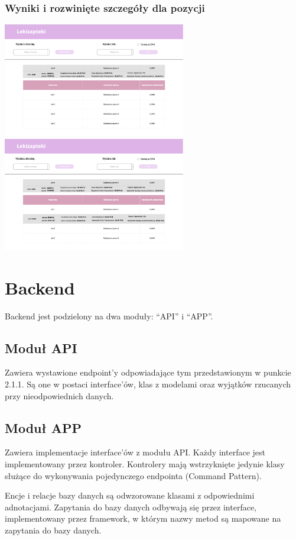 \documentclass{article}
\begin{document}
      \subsubsection{Wyniki i rozwinięte szczegóły dla pozycji}
      \includegraphics[width=8cm]{images/lekizapteki-leki-identyczne}
      \includegraphics[width=8cm]{images/lekizapteki-leki-identyczne-rozwiniete}

  \section{Backend}
  Backend jest podzielony na dwa moduły: ``API'' i ``APP''.

    \subsection{Moduł API}
    Zawiera wystawione endpoint'y odpowiadające tym przedstawionym w punkcie 2.1.1.
    Są one w postaci interface'ów, klas z modelami oraz wyjątków rzucanych przy nieodpowiednich danych.

    \subsection{Moduł APP}
    Zawiera implementacje interface'ów z modułu API.
    Każdy interface jest implementowany przez kontroler.
    Kontrolery mają wstrzyknięte jedynie klasy służące do wykonywania pojedynczego endpointa (Command Pattern).

    Encje i relacje bazy danych są odwzorowane klasami z odpowiednimi adnotacjami.
    Zapytania do bazy danych odbywają się przez interface, implementowany przez framework,
    w którym nazwy metod są mapowane na zapytania do bazy danych.
\end{document}
